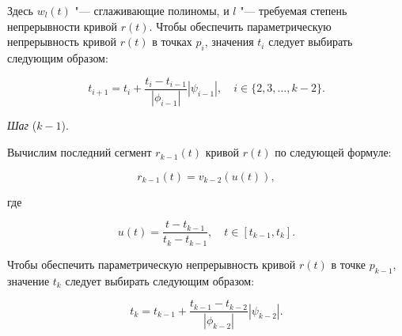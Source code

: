Здесь $w_l(t)$ "--- сглаживающие полиномы, и $l$ "--- требуемая степень непрерывности кривой $r(t)$. Чтобы обеспечить
параметрическую непрерывность кривой $r(t)$ в точках $p_i$, значения $t_i$ следует выбирать следующим образом:

$$
t_{i+1}=t_i+\frac{t_i-t_{i-1}}{|\phi_{i-1}|}|\psi_{i-1}|, \quad i \in \{2,3,\dots,k-2\}.
$$

\bigskip
\textit{Шаг} ($k-1$).

Вычислим последний сегмент $r_{k-1}(t)$ кривой $r(t)$ по следующей формуле:

$$
r_{k-1}(t)=v_{k-2}(u(t)),
$$

\noindent где

$$
u(t)=\frac{t-t_{k-1}}{t_k-t_{k-1}}, \quad t \in [t_{k-1},t_k].
$$

Чтобы обеспечить параметрическую непрерывность кривой $r(t)$ в точке $p_{k-1}$, значение $t_k$ следует выбирать
следующим образом:

$$
t_k=t_{k-1}+\frac{t_{k-1}-t_{k-2}}{|\phi_{k-2}|}|\psi_{k-2}|.
$$
